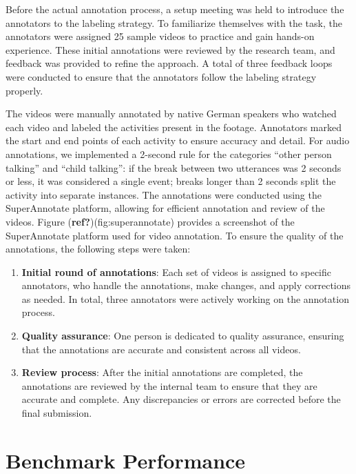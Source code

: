\documentclass[
  man,floatsintext]{apa6}
\providecommand{\tightlist}{%
  \setlength{\itemsep}{0pt}\setlength{\parskip}{0pt}}
\begin{document}
Before the actual annotation process, a setup meeting was held to introduce the annotators to the labeling strategy. To familiarize themselves with the task, the annotators were assigned 25 sample videos to practice and gain hands-on experience. These initial annotations were reviewed by the research team, and feedback was provided to refine the approach. A total of three feedback loops were conducted to ensure that the annotators follow the labeling strategy properly.

The videos were manually annotated by native German speakers who watched each video and labeled the activities present in the footage. Annotators marked the start and end points of each activity to ensure accuracy and detail. For audio annotations, we implemented a 2-second rule for the categories ``other person talking'' and ``child talking'': if the break between two utterances was 2 seconds or less, it was considered a single event; breaks longer than 2 seconds split the activity into separate instances. The annotations were conducted using the SuperAnnotate platform, allowing for efficient annotation and review of the videos. Figure (\textbf{ref?})(fig:superannotate) provides a screenshot of the SuperAnnotate platform used for video annotation. To ensure the quality of the annotations, the following steps were taken:

\begin{enumerate}
\def\labelenumi{\arabic{enumi}.}
\tightlist
\item
  \textbf{Initial round of annotations}: Each set of videos is assigned to specific annotators, who handle the annotations, make changes, and apply corrections as needed. In total, three annotators were actively working on the annotation process.
\item
  \textbf{Quality assurance}: One person is dedicated to quality assurance, ensuring that the annotations are accurate and consistent across all videos.
\item
  \textbf{Review process}: After the initial annotations are completed, the annotations are reviewed by the internal team to ensure that they are accurate and complete. Any discrepancies or errors are corrected before the final submission.
\end{enumerate}

\section{Benchmark Performance}\label{benchmark-performance}
\end{document}
